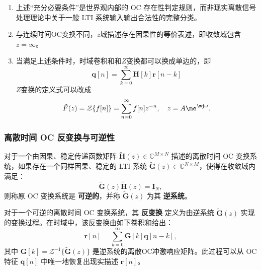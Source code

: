 \begin{remark}
    \begin{enumerate}
        \item 上述“充分必要条件”是\wkn{}世界观内部的 OC 存在性判定规则，而非现实离散信号处理理论中关于一般 LTI 系统输入输出合法性的完整分类。
        \item 与连续时间OC变换不同，\(z\)域描述存在因果性的等价表述，即收敛域包含\(z=\infty\)。
        \item 当满足上述条件时，时域卷积和和\(Z\)变换都可以换成单边的，即
              \begin{equation}
                  \mathbf{q}[n] = \sum_{k=0}^{\infty} \mathbf{H}[k] \mathbf{r}[n-k]
              \end{equation}
              \(Z\)变换的定义式可以改成
              \begin{equation}
                  \tilde{F}(z)=\mathcal{Z}\{f[n]\}=\sum_{n=0}^{\infty}f[n]z^{-n},\quad z=A\me^{\mj\omega}.
              \end{equation}
    \end{enumerate}
\end{remark}

\subsubsection{离散时间 OC 反变换与可逆性}

\begin{definition}
    对于一个由因果、稳定传递函数矩阵 $\tilde{\mathbf{H}}(z) \in \mathbb{C}^{M \times N}$ 描述的离散时间 OC 变换系统，如果存在一个同样因果、稳定的 LTI 系统 $\tilde{\mathbf{G}}(z) \in \mathbb{C}^{N \times M}$，使得在收敛域内满足：
    \begin{equation}
        \tilde{\mathbf{G}}(z) \tilde{\mathbf{H}}(z) = \mathbf{I}_N,
    \end{equation}
    则称原 OC 变换系统是 \textbf{可逆的}，并称 $\tilde{\mathbf{G}}(z)$ 为其 \textbf{逆系统}。
\end{definition}

\begin{definition}
    对于一个可逆的离散时间 OC 变换系统，其 \textbf{反变换} 定义为由逆系统 $\tilde{\mathbf{G}}(z)$ 实现的变换过程。在时域中，该反变换由如下卷积和给出：
    \begin{equation}
        \mathbf{r}[n] = \sum_{k=0}^{\infty} \mathbf{G}[k] \mathbf{q}[n-k],
        \label{eq:inv-disc}
    \end{equation}
    其中 $\mathbf{G}[k] = \mathcal{Z}^{-1}\{\tilde{\mathbf{G}}(z)\}$ 是逆系统的离散OC冲激响应矩阵。此过程可以从 OC 特征 $\mathbf{q}[n]$ 中唯一地恢复出现实描述 $\mathbf{r}[n]$。
\end{definition}

